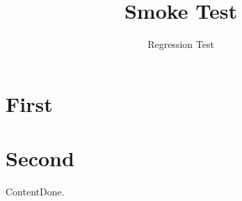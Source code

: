 \documentclass{beamer}
\title[Short title]{Smoke Test}
\author{Regression Test}
\begin{document}
\begin{frame}\titlepage\end{frame}
\section{First}
\sepframe[title={Custom First}]
\section{Second}
\sepframe
\begin{frame}{Content}Done.\end{frame}
\end{document}

